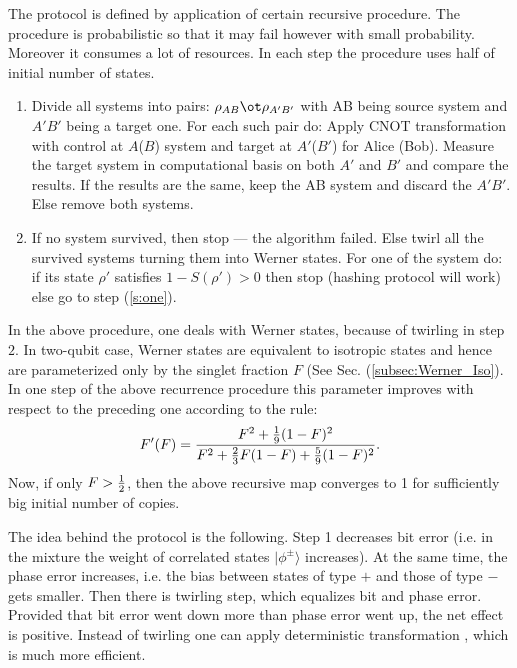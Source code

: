 \documentclass[twocolumn,aps,rmp]{revtex4}
\begin{document}
The protocol is defined by application of certain recursive
procedure. The procedure is probabilistic so that it may fail however
with small probability. Moreover it consumes a lot of resources. In
each step the procedure uses half of initial number of states.
\begin{enumerate}
\item
\label{s:one} Divide all systems into pairs:
$\rho_{AB}\ot\rho_{A'B'}$ with AB being source system and $A'B'$ being
a target one. For each such pair do:  Apply CNOT
transformation with control at $A$($B$) system and target at
$A'$($B'$) for Alice (Bob).  Measure the target system
in computational basis on both $A'$ and $B'$ and compare the
results.  If the results are the same, keep the AB
system and discard the $A'B'$. Else remove both systems.

\item If no system survived, then stop --- the algorithm failed. Else
  twirl all the survived systems turning them into Werner states.
 For one of the system do: if its state $\rho'$ satisfies
$1-S(\rho')>0$ then stop (hashing protocol will work) else go to
step (\ref{s:one}).
\end{enumerate}

In the above procedure, one deals with Werner states, because of
twirling in step $2$. In two-qubit case, Werner states are equivalent
to isotropic states and hence are parameterized only by the singlet
fraction $F$ (See Sec. (\ref{subsec:Werner_Iso}).  In one step of the
above recurrence procedure this parameter improves with respect to the
preceding one according to the rule:
\begin{equation}
F'(F) = {{F^2+{1\over 9}(1-F)^2}\over {F^2+{2\over
3}F(1-F)+{5\over 9}(1-F)^2}}.
\end{equation}
Now, if only $F>{1\over 2}$, then the above recursive map converges to
1 for sufficiently big initial number of copies.

The idea behind the protocol is the following. Step 1 decreases bit
error (i.e. in the mixture the weight of correlated states
$|\phi^\pm\rangle$ increases). At the same time, the phase error
increases, i.e. the bias between states of type $+$ and those of type
$-$ gets smaller. Then there is twirling step, which equalizes bit and
phase error. Provided that bit error went down more than phase error went
up, the net effect is positive. Instead of twirling one can apply
deterministic transformation \cite{QPA}, which is much more efficient.
\end{document}
